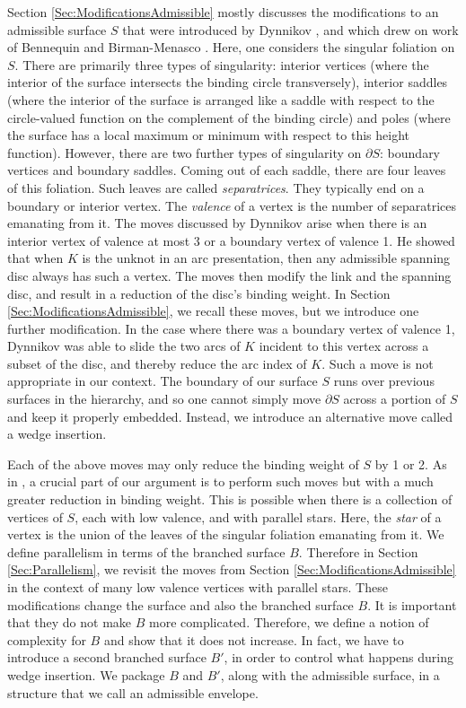 \documentclass[oneside]{amsart}
\numberwithin{equation}{section}
\theoremstyle{plain}
\theoremstyle{definition}
\begin{document}
Section \ref{Sec:ModificationsAdmissible} mostly discusses the modifications to an admissible surface $S$
that were introduced by Dynnikov \cite{Dynnikov}, and which drew on work of Bennequin \cite{Bennequin}
and Birman-Menasco \cite{BirmanMenasco}. Here, one considers the singular foliation on $S$.
There are primarily three types of singularity: interior vertices (where the interior of the surface intersects the binding circle transversely),
interior saddles (where the interior of the surface is arranged like a saddle with respect to the circle-valued function on the
complement of the binding circle) and poles (where the surface has a local maximum or minimum with respect
to this height function). However, there are two further types of singularity on $\partial S$:
boundary vertices and boundary saddles. Coming out of each saddle, there are four leaves
of this foliation. Such leaves are called \emph{separatrices}. They typically end on a boundary
or interior vertex. The \emph{valence} of a vertex is the number of separatrices emanating from it.
The moves discussed by Dynnikov arise when there is an interior vertex of valence at most 3
or a boundary vertex of valence 1. He showed that when $K$ is the unknot in an arc presentation,
then any admissible spanning disc always has such a vertex. The moves then modify the link
and the spanning disc, and result in a reduction of the disc's binding weight. In Section \ref{Sec:ModificationsAdmissible},
we recall these moves, but we introduce one further modification. In the case where
there was a boundary vertex of valence 1, Dynnikov was able to slide the two arcs of
$K$ incident to this vertex across a subset of the disc, and thereby reduce the arc index of
$K$. Such a move is not appropriate in our context. The boundary of our surface $S$ runs
over previous surfaces in the hierarchy, and so one cannot simply move $\partial S$ across
a portion of $S$ and keep it properly embedded. Instead, we introduce an alternative move
called a wedge insertion.

Each of the above moves may only reduce the binding weight of $S$ by 1 or 2.
As in \cite{Lackenby:PolyUnknot}, a crucial part of our argument is to perform such moves
but with a much greater reduction in binding weight. This is possible when there is a collection
of vertices of $S$, each with low valence, and with parallel stars. Here, the \emph{star} of a vertex
is the union of the leaves of the singular foliation emanating from it. We define parallelism
in terms of the branched surface $B$. Therefore in Section \ref{Sec:Parallelism}, we 
revisit the moves from Section \ref{Sec:ModificationsAdmissible} in the context of many
low valence vertices with parallel stars. These modifications change the surface and also
the branched surface $B$. It is important that they do not make $B$ more complicated.
Therefore, we define a notion of complexity for $B$ and show that it does not increase.
In fact, we have to introduce a second branched surface $B'$, in order to control what happens
during wedge insertion. We package $B$ and $B'$, along with the admissible surface, in
a structure that we call an admissible envelope.
\end{document}
